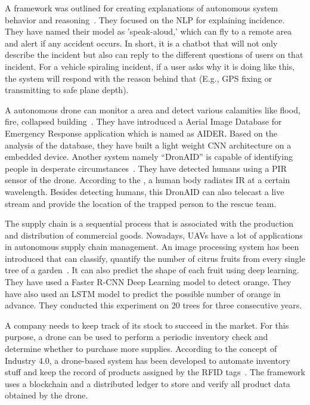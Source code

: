A framework  was outlined for creating explanations of autonomous system behavior and reasoning~\cite{garcia2018explainable}. They focused on the NLP for explaining incidence. They have named their model as 'speak-aloud,' which can fly to a remote area and alert if any accident occurs. In short, it is a chatbot that will not only describe the incident but also can reply to the different questions of users on that incident. For a vehicle spiraling incident, if a user asks why it is doing like this, the system will respond with the reason behind that (E.g., GPS fixing or transmitting to safe plane depth).

A autonomous drone can monitor a area and detect various calamities like flood, fire, collapsed building~\cite{kyrkou2019deep}. They have introduced a Aerial Image Database for Emergency Response application which is named as AIDER. Based on the analysis of the database, they have built a light weight CNN architecture on a embedded device.
Another system namely ``DronAID'' is capable of identifying people in desperate circumstances~\cite{tariq2018dronaid}. They have detected humans using a PIR sensor of the drone. According to the \cite{jin2011target}, a human body radiates IR at a certain wavelength. Besides detecting humans, this DronAID can also telecast a live stream and provide the location of the trapped person to the rescue team. 

The supply chain is a sequential process that is associated with the production and distribution of commercial goods. Nowadays, UAVs have a lot of applications in autonomous supply chain management. An image processing system has been introduced that can classify, quantify the number of citrus fruits from every single tree of a garden~\cite{apolo2020deep}. It can also predict the shape of each fruit using deep learning. They have used a Faster R-CNN Deep Learning model to detect orange. They have also used an LSTM model to predict the possible number of orange in advance. They conducted this experiment on 20 trees for three consecutive years.

A company needs to keep track of its stock to succeed in the market. For this purpose, a drone can be used to perform a periodic inventory check and determine whether to purchase more supplies. According to the concept of Industry 4.0, a drone-based system has been developed to automate inventory stuff and keep the record of products assigned by the RFID tags~\cite{fernandez2019towards}. The framework uses a blockchain and a distributed ledger to store and verify all product data obtained by the drone. 